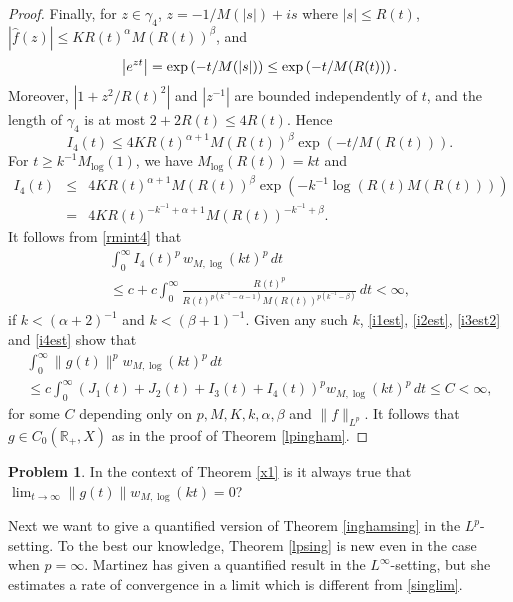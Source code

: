 \documentclass[11pt]{amsart}
\theoremstyle{definition}
\newtheorem{problem}[theorem]{Problem}
\theoremstyle{remark}
\numberwithin{equation}{section}
\begin{document}
\begin{proof}
Finally, for $z \in \gamma_4$, $z = -1/M(|s|) + is$ where $|s| \le  R(t)$, $|\widehat f(z)| \le K R(t)^\alpha M(R(t))^\beta$, and
\[
\left| e^{zt} \right| = \exp \left( - t/M(|s|) \right) \le \exp \left( -t/M(R(t)) \right). \\
\]
Moreover, $|1+z^2/R(t)^2|$ and $|z^{-1}|$ are bounded independently of $t$, and the length of $\gamma_4$ is at most $2+ 2R(t) \le 4 R(t)$.  Hence
\begin{equation} \label{i4est1}
I_4(t) \le 4K R(t)^{\alpha+1} M(R(t))^{\beta} \exp \left( -t/M(R(t)) \right).
\end{equation}
For  $t\ge k^{-1} M_{\log}(1)$, we have $M_{\log}(R(t)) = kt$ and
\begin{eqnarray*}
I_4(t) &\le& 4K R(t)^{\alpha+1} M(R(t))^{\beta} \exp \left(- k^{-1} \log(R(t)M(R(t))) \right) \\
&=& 4K R(t)^{-k^{-1}+\alpha+1} M(R(t))^{-k^{-1}+\beta}.
\end{eqnarray*}
It follows from \eqref{rmint4} that
\begin{multline} \label{i4est}
\int_{0}^{\infty} I_4(t) ^p \, {w_{M,{\log}}}(kt)^{p}\,dt \\ \le c + c \int_{0} ^\infty \frac {R(t)^p}{R(t)^{p(k^{-1}-\alpha-1)}M(R(t))^{p(k^{-1}-\beta)}} \, dt < \infty,
\end{multline}
if $k < (\alpha+2)^{-1}$ and $k < (\beta+1)^{-1}$.  Given any such $k$, \eqref{i1est}, \eqref{i2est}, \eqref{i3est2} and \eqref{i4est} show that
\begin{multline*}
\int_0^\infty \|g(t)\|^p {w_{M,{\log}}}(kt)^{p}
\,dt\\
 \le c \int_0^{\infty} (J_1(t)+J_2(t)+I_3(t)+I_4(t))^p {w_{M,{\log}}}(kt)^{p}
\,dt \le C < \infty,
\end{multline*}
for some
$C$ depending only on $p,M,K,k,\alpha,\beta$ and $\| f \|_{L^p}$.  It follows that $g \in C_0({{\mathbb R}}_+,X)$ as in the proof of Theorem \ref{lpingham}.
\end{proof}

\begin{problem}
In the context of Theorem \ref{x1} is it always true that \linebreak[5] $\lim_{t\to\infty} \|g(t)\| {w_{M,{\log}}}(kt) = 0$?
\end{problem}

Next we want to give a quantified version of Theorem \ref{inghamsing} in the $L^p$-setting.  To the best our knowledge, Theorem \ref{lpsing} is new even in the case when $p=\infty$.  Martinez \cite{Ma11} has given a quantified result in the $L^\infty$-setting, but she estimates a rate of convergence in a limit which is different from \eqref{singlim}.
\end{document}
